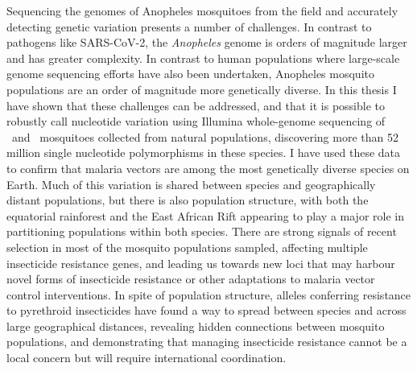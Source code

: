 \documentclass[a4paper,11pt,abstracton,hidelinks]{scrartcl}
\begin{document}
Sequencing the genomes of Anopheles mosquitoes from the field and accurately detecting genetic variation presents a number of challenges.
%
In contrast to pathogens like SARS-CoV-2, the \textit{Anopheles} genome is orders of magnitude larger and has greater complexity.
%
In contrast to human populations where large-scale genome sequencing efforts have also been undertaken, Anopheles mosquito populations are an order of magnitude more genetically diverse.
%
In this thesis I have shown that these challenges can be addressed, and that it is possible to robustly call nucleotide variation using Illumina whole-genome sequencing of \agam\ and \acol\ mosquitoes collected from natural populations, discovering more than 52 million single nucleotide polymorphisms in these species.
%
I have used these data to confirm that malaria vectors are among the most genetically diverse species on Earth.
%
Much of this variation is shared between species and geographically distant populations, but there is also population structure, with both the equatorial rainforest and the East African Rift appearing to play a major role in partitioning populations within both species.
%
There are strong signals of recent selection in most of the mosquito populations sampled, affecting multiple insecticide resistance genes, and leading us towards new loci that may harbour novel forms of insecticide resistance or other adaptations to malaria vector control interventions.
%
In spite of population structure, alleles conferring resistance to pyrethroid insecticides have found a way to spread between species and across large geographical distances, revealing hidden connections between mosquito populations, and demonstrating that managing insecticide resistance cannot be a local concern but will require international coordination.
\end{document}
